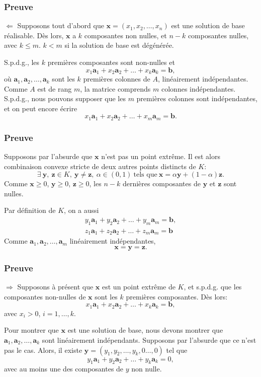 \documentclass[usepdftitle=false]{beamer}
\def\ba{\boldsymbol{a}}
\def\bb{\boldsymbol{b}}
\def\bx{\boldsymbol{x}}
\def\by{\boldsymbol{y}}
\def\bz{\boldsymbol{z}}
\begin{document}
\begin{frame}
\frametitle{Preuve}

$\Leftarrow$ Supposons tout d'abord que $\bx = (x_1, x_2, \ldots, x_n)$ est une solution de base réalisable.
Dès lors, $\bx$ a $k$ composantes non nulles, et $n-k$ composantes nulles, avec $k \leq m$. $k < m$ si la solution de base est dégénérée.

\mbox{}

S.p.d.g., les $k$ premières composantes sont non-nulles et
\[
  x_1 \ba_1 + x_2 \ba_2 + \ldots + x_k \ba_k = \bb,
\]
où $\ba_1, \ba_2, \ldots, \ba_k$ sont les $k$ premières colonnes de $A$, linéairement indépendantes. Comme $A$ est de rang $m$, la matrice comprends $m$ colonnes indépendantes. S.p.d.g., nous pouvons supposer que les $m$ premières colonnes sont indépendantes, et on peut encore écrire
\[
x_1 \ba_1 + x_2 \ba_2 + \ldots + x_m \ba_m = \bb.
\]

\end{frame}

\begin{frame}
\frametitle{Preuve}

Supposons par l'absurde que $\bx$ n'est pas un point extrême. Il est alors combinaison convexe stricte de deux autres points distincts de $K$:
\[
\exists \ \by,\ \bz \in K,\ \by \ne \bz, \ \alpha \in (0,1) \ \mbox{tels que}\ \bx = \alpha \by + (1-\alpha) \bz.
\]
Comme $\bx \geq 0$, $\by \geq 0$, $\bz \geq 0$, les $n-k$ dernières composantes de $\by$ et $\bz$ sont nulles.

\mbox{}

Par définition de $K$, on a aussi
\begin{align*}
y_1 \ba_1 + y_2 \ba_2 + \ldots + y_m \ba_m = \bb, \\
z_1 \ba_1 + z_2 \ba_2 + \ldots + z_m \ba_m = \bb
\end{align*}
Comme $\ba_1, \ba_2, \ldots, \ba_m$ linéairement indépendantes,
\[
\bx = \by = \bz.
\]

\end{frame}

\begin{frame}
\frametitle{Preuve}

$\Rightarrow$ Supposons à présent que $\bx$ est un point extrême de $K$, et s.p.d.g. que les composantes non-nulles de $\bx$ sont les $k$ premières composantes. Dès lors:
\[
x_1 \ba_1 + x_2 \ba_2 + \ldots + x_k \ba_k = \bb,
\]
avec $x_i > 0$, $i = 1,\ldots,k$.

\mbox{}

Pour montrer que $\bx$ est une solution de base, nous devons montrer que $\ba_1, \ba_2,\ldots, \ba_k$ sont linéairement indépendants. Supposons par l'absurde que ce n'est pas le cas. Alors, il existe $\by = ( y_1, y_2,\ldots,y_k,0\ldots,0)$ tel que
\[
y_1 \ba_1 + y_2 \ba_2 + \ldots + y_k \ba_k = 0,
\]
avec au moins une des composantes de $y$ non nulle.

\end{frame}
\end{document}
